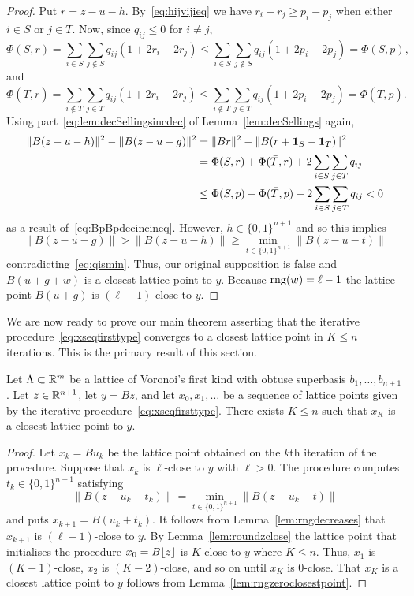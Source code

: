 \documentclass[final,leqno]{siamltex}
\begin{document}
\begin{proof}
Put $r = z - u - h$.  By~\eqref{eq:hijvijieq} we have $r_i - r_j \geq p_{i} - p_{j}$ when either $i \in S$ or $j \in T$.  Now, since $q_{ij} \leq 0$ for $i \neq j$,
\[
\Phi(S,r) = \sum_{i \in S}\sum_{j \notin S}q_{ij}(1 + 2r_i - 2r_j) \leq \sum_{i \in S}\sum_{j \notin S}q_{ij}(1 + 2p_i - 2p_j) = \Phi(S,p),
\]
and
\[
\Phi(\bar{T},r) = \sum_{i \notin T}\sum_{j \in T}q_{ij}(1 + 2r_i - 2r_j) \leq \sum_{i \notin T}\sum_{j \in T}q_{ij}(1 + 2p_i - 2p_j) = \Phi(\bar{T},p).
\]
Using part~\ref{eq:lem:decSellingsincdec} of Lemma~\ref{lem:decSellings} again,
\begin{align*}
\|B(z-u-h)\|^2 - \|B(z-u-g)\|^2 &= \|Br\|^2 - \|B(r+\boldsymbol{1}_S - \boldsymbol{1}_T)\|^2 \\
&= \Phi(S,r) + \Phi(\bar{T},r) + 2\sum_{i\in S}\sum_{j \in T} q_{ij} \\
&\leq \Phi(S,p) + \Phi(\bar{T}, p) + 2\sum_{i\in S}\sum_{j \in T} q_{ij} < 0 
\end{align*}
as a result of~\eqref{eq:BpBpdecincineq}.  However, $h \in \{0,1\}^{n+1}$ and so this implies
\[
\|B(z-u-g)\| > \|B(z-u-h)\| \geq \min_{t \in \{0,1\}^{n+1}}\|B(z - u - t)\|
\]
contradicting~\eqref{eq:qismin}.  Thus, our original supposition is false and $B(u+g+w)$ is a closest lattice point to $y$. Because $\operatorname{rng}(w) = \ell-1$ the lattice point $B(u+g)$ is $(\ell-1)$-close to $y$.
 \end{proof}

We are now ready to prove our main theorem asserting that the iterative procedure~\eqref{eq:xseqfirsttype} converges to a closest lattice point in $K \leq n$ iterations.  This is the primary result of this section.

\begin{theorem}\label{thm:mainitrconvthm}
Let $\Lambda \subset {\mathbb R}^m$ be a lattice of Voronoi's first kind with obtuse superbasis $b_1,\dots,b_{n+1}$.  Let $z \in {\mathbb R}^{n+1}$, let $y = Bz$, and let $x_0,x_1,\dots$ be a sequence of lattice points given by the iterative procedure~\eqref{eq:xseqfirsttype}.  There exists $K \leq n$ such that $x_K$ is a closest lattice point to $y$.
\end{theorem}
\begin{proof}
Let $x_k = B u_k$ be the lattice point obtained on the $k$th iteration of the procedure.  Suppose that $x_k$ is $\ell$-close to $y$ with $\ell > 0$.  The procedure computes $t_{k} \in \{0,1\}^{n+1}$ satisfying
\[
\|B(z - u_k - t_{k})\| = \min_{t \in \{0,1\}^{n+1}}\|B(z - u_k - t)\|
\]
and puts $x_{k+1} = B(u_k + t_k)$.  It follows from Lemma~\ref{lem:rngdecreases} that $x_{k+1}$ is $(\ell-1)$-close to $y$.  By Lemma~\ref{lem:roundzclose} the lattice point that initialises the procedure $x_0 = B {\left\lfloor z \right\rfloor}$ is $K$-close to $y$ where $K \leq n$.  Thus, $x_1$ is $(K-1)$-close, $x_2$ is $(K-2)$-close, and so on until $x_K$ is $0$-close.  That $x_K$ is a closest lattice point to $y$ follows from Lemma~\ref{lem:rngzeroclosestpoint}.
\end{proof}
\end{document}

